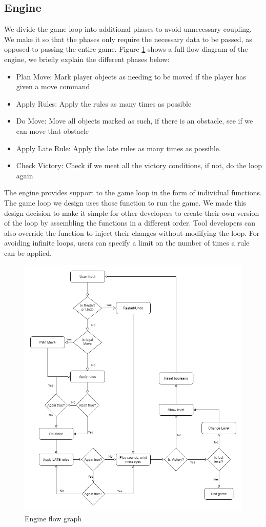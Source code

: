 \subsection{Engine}
We divide the game loop into additional phases to avoid unnecessary coupling. We make it so that the phases only require the necessary data to be passed\dd, as opposed to passing the entire game. Figure \ref{fig:engine_flow} shows a full flow diagram of the engine, we briefly explain the different phases below:
\begin{itemize}
    \item Plan Move: Mark player objects as needing to be moved if the player has given a move command
    \item Apply Rules: Apply the rules as many times as possible
    \item Do Move: Move all objects marked as such, if there is an obstacle, see if we can move that obstacle
    \item Apply Late Rule: Apply the late rules as many times as possible.
    \item Check Victory: Check if we meet all the victory conditions, if not, do the loop again
\end{itemize}

The engine provides support to the game loop in the form of individual functions\dd. The game loop we design uses those function to run the game. We made this design decision to make it simple for other developers to create their own version of the loop by assembling the functions in a different order. Tool developers can also override the function to inject their changes without modifying the loop. For avoiding infinite loops, users can specify a limit on the number of times a rule can be applied.

\begin{figure}[!t]
    \centering
    \includegraphics[width=1\textwidth]{images/Engine Flow.drawio.png}
    \caption{Engine flow graph}
    \label{fig:engine_flow}
\end{figure}

